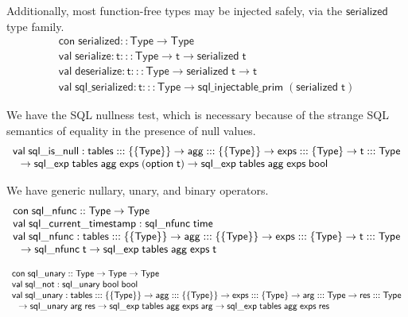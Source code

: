 \documentclass{article}
\newcommand{\mt}[1]{\mathsf{#1}}
\begin{document}
Additionally, most function-free types may be injected safely, via the $\mt{serialized}$ type family.
$$\begin{array}{l}
  \mt{con} \; \mt{serialized} :: \mt{Type} \to \mt{Type} \\
  \mt{val} \; \mt{serialize} : \mt{t} ::: \mt{Type} \to \mt{t} \to \mt{serialized} \; \mt{t} \\
  \mt{val} \; \mt{deserialize} : \mt{t} ::: \mt{Type} \to \mt{serialized} \; \mt{t} \to \mt{t} \\
  \mt{val} \; \mt{sql\_serialized} : \mt{t} ::: \mt{Type} \to \mt{sql\_injectable\_prim} \; (\mt{serialized} \; \mt{t})
\end{array}$$

We have the SQL nullness test, which is necessary because of the strange SQL semantics of equality in the presence of null values.
$$\begin{array}{l}
  \mt{val} \; \mt{sql\_is\_null} : \mt{tables} ::: \{\{\mt{Type}\}\} \to \mt{agg} ::: \{\{\mt{Type}\}\} \to \mt{exps} ::: \{\mt{Type}\} \to \mt{t} ::: \mt{Type} \\
  \hspace{.1in} \to \mt{sql\_exp} \; \mt{tables} \; \mt{agg} \; \mt{exps} \; (\mt{option} \; \mt{t}) \to \mt{sql\_exp} \; \mt{tables} \; \mt{agg} \; \mt{exps} \; \mt{bool}
\end{array}$$

We have generic nullary, unary, and binary operators.
$$\begin{array}{l}
  \mt{con} \; \mt{sql\_nfunc} :: \mt{Type} \to \mt{Type} \\
  \mt{val} \; \mt{sql\_current\_timestamp} : \mt{sql\_nfunc} \; \mt{time} \\
  \mt{val} \; \mt{sql\_nfunc} : \mt{tables} ::: \{\{\mt{Type}\}\} \to \mt{agg} ::: \{\{\mt{Type}\}\} \to \mt{exps} ::: \{\mt{Type}\} \to \mt{t} ::: \mt{Type} \\
  \hspace{.1in} \to \mt{sql\_nfunc} \; \mt{t} \to \mt{sql\_exp} \; \mt{tables} \; \mt{agg} \; \mt{exps} \; \mt{t} \\\end{array}$$

$$\begin{array}{l}
  \mt{con} \; \mt{sql\_unary} :: \mt{Type} \to \mt{Type} \to \mt{Type} \\
  \mt{val} \; \mt{sql\_not} : \mt{sql\_unary} \; \mt{bool} \; \mt{bool} \\
  \mt{val} \; \mt{sql\_unary} : \mt{tables} ::: \{\{\mt{Type}\}\} \to \mt{agg} ::: \{\{\mt{Type}\}\} \to \mt{exps} ::: \{\mt{Type}\} \to \mt{arg} ::: \mt{Type} \to \mt{res} ::: \mt{Type} \\
  \hspace{.1in} \to \mt{sql\_unary} \; \mt{arg} \; \mt{res} \to \mt{sql\_exp} \; \mt{tables} \; \mt{agg} \; \mt{exps} \; \mt{arg} \to \mt{sql\_exp} \; \mt{tables} \; \mt{agg} \; \mt{exps} \; \mt{res} \\
\end{array}$$
\end{document}

